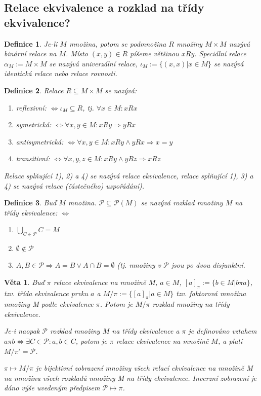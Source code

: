 \documentclass[a4paper, 11pt]{report}
\newtheorem{mydef}{Definice}[chapter]
\newtheorem{veta}{Věta}[chapter]
\begin{document}
\subsection{Relace ekvivalence a rozklad na třídy ekvivalence?} %
\begin{mydef}
Je-li $M$ množina, potom se podmnožina $R$ množiny $M \times M$ nazývá binární relace na $M$. Místo $(x, y) \in R$ píšeme většinou $xRy$. Speciální relace $\alpha_M := M \times M$ se nazývá univerzální relace, $\iota_M := \{(x, x) | x \in M\}$ se nazývá identická relace nebo relace rovnosti.
\end{mydef}

\begin{mydef}
Relace $R \subseteq M \times M$ se nazývá:
\begin{enumerate}[1)]
	\item \emph{reflexivní}: $\Leftrightarrow \iota_M \subseteq R$, tj. $\forall x \in M: xRx$
	\item \emph{symetrická}: $\Leftrightarrow \forall x, y \in M: xRy \Rightarrow yRx$
	\item \emph{antisymetrická}: $\Leftrightarrow \forall x, y \in M: xRy \land yRx \Rightarrow x = y$
	\item \emph{transitivní}: $\Leftrightarrow \forall x, y, z \in M: xRy \land yRz \Rightarrow xRz$
\end{enumerate}
Relace splňující 1), 2) a 4) se nazývá relace \emph{ekvivalence}, relace splňující 1), 3) a 4) se nazývá relace \emph{(částečného) uspořádání)}.
\end{mydef}

\begin{mydef}
Buď $M$ množina. $\mathcal{P} \subseteq \mathcal{P}(M)$ se nazývá rozklad množiny $M$ na třídy ekvivalence: $\Leftrightarrow$
\begin{enumerate}[1)]
	\item $\bigcup_{C \in \mathcal{P}} C = M$
	\item $\emptyset \not\in \mathcal{P}$
	\item $A, B \in \mathcal{P}  \Rightarrow A = B \lor A \cap B = \emptyset$ (tj. množiny v $\mathcal{P}$ jsou po dvou disjunktní.
\end{enumerate}
\end{mydef}

\begin{veta}
Buď $\pi$ relace ekvivalence na množině $M$, $a \in M$, $[a]_\pi := \{b \in M | b \pi a\}$, tzv. třída ekvivalence prvku $a$ a $M/\pi := \{[a]_\pi | a \in M\}$ tzv. faktorová množina množiny M podle ekvivalence $\pi$. Potom je $M/\pi$ rozklad množiny na třídy ekvivalence.

Je-i naopak $\mathcal{P}$ rozklad množiny $M$ na třídy ekvivalence a $\pi$ je definováno vztahem $a \pi b \Leftrightarrow \exists C \in \mathcal{P}: a, b \in C$, potom je $\pi$ relace ekvivalence na množině $M$, a platí $M/\pi' = \mathcal{P}$.

$\pi \mapsto M/\pi$ je bijektivní zobrazení množiny všech relací ekvivalence na množině M na množinu všech rozkladů množiny M na třídy ekvivalence. Inverzní zobrazení je dáno výše uvedeným předpisem $\mathcal{P} \mapsto \pi$.
\end{veta}
\end{document}
